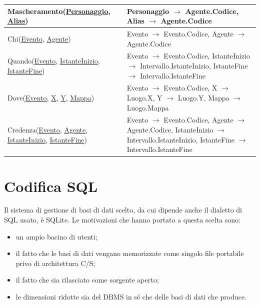 \documentclass{article}
\begin{document}
\begin{center}
\begin{tabular}{|p{}|p{}|}
		\hline
		Mascheramento(\underline{Personaggio}, \underline{Alias})                                            & Personaggio $\rightarrow$ Agente.Codice, Alias $\rightarrow$ Agente.Codice                                                                                                     \\
		\hline
		Chi(\underline{Evento}, \underline{Agente})                                                          & Evento $\rightarrow$ Evento.Codice, Agente $\rightarrow$ Agente.Codice                                                                                                         \\
		\hline
		Quando(\underline{Evento}, \underline{IstanteInizio}, \underline{IstanteFine})                       & Evento $\rightarrow$ Evento.Codice, IstanteInizio $\rightarrow$ Intervallo.IstanteInizio, IstanteFine $\rightarrow$ Intervallo.IstanteFine                                     \\
		\hline
		Dove(\underline{Evento}, \underline{X}, \underline{Y}, \underline{Mappa})                            & Evento $\rightarrow$ Evento.Codice, X $\rightarrow$ Luogo.X, Y $\rightarrow$ Luogo.Y, Mappa $\rightarrow$ Luogo.Mappa                                                          \\
		\hline
		Credenza(\underline{Evento}, \underline{Agente}, \underline{IstanteInizio}, \underline{IstanteFine}) & Evento $\rightarrow$ Evento.Codice, Agente $\rightarrow$ Agente.Codice, IstanteInizio $\rightarrow$ Intervallo.IstanteInizio, IstanteFine $\rightarrow$ Intervallo.IstanteFine \\
		\hline
	\end{tabular}\end{center}

\section{Codifica SQL}

Il sistema di gestione di basi di dati scelto, da cui dipende anche il dialetto
di SQL usato, è SQLite. Le motivazioni che hanno portato a questa scelta sono:
\begin{itemize}
	\item un ampio bacino di utenti;
	\item il fatto che le basi di dati vengano memorizzate come singolo file
	      portabile privo di architettura C/S;
	\item il fatto che sia rilasciato come sorgente aperto;
	\item le dimensioni ridotte sia del DBMS in sé che delle basi di dati che
	      produce.
\end{itemize}
\end{document}

